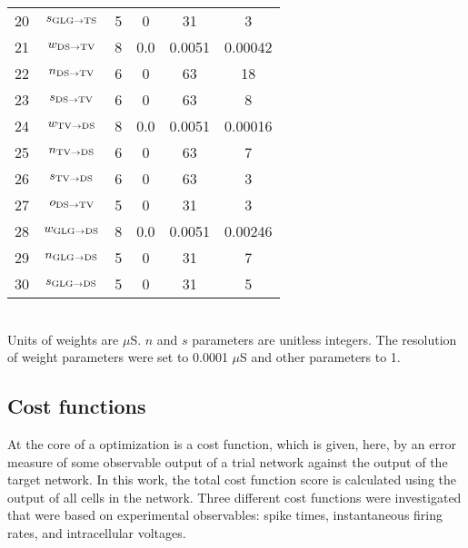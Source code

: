 \begin{table}[tp]
\begin{tabularx}{0.7\textwidth}{lccccc}
20 & $s_{{\rm GLG}\to {\rm TS}} $  &  5  &  0  &    31     & 3 \\   %
21 &  $w_{{\rm DS}\to {\rm TV}} $  &  8  & 0.0 &  0.0051   & 0.00042 \\ %
22 &  $n_{{\rm DS}\to {\rm TV}} $  &  6  &  0  &    63     & 18 \\ %
23 &  $s_{{\rm DS}\to {\rm TV}} $  &  6  &  0  &    63     & 8 \\   %
24 &  $w_{{\rm TV}\to {\rm DS}} $  &  8  & 0.0 &  0.0051   & 0.00016 \\ %
25 &  $n_{{\rm TV}\to {\rm DS}} $  &  6  &  0  &    63     & 7   \\ %
26 &  $s_{{\rm TV}\to {\rm DS}} $  &  6  &  0  &    63     & 3 \\   %
27 &  $o_{{\rm DS}\to {\rm TV}} $  &  5  &  0  &    31     & 3 \\ %
28 & $w_{{\rm GLG}\to {\rm DS}} $  &  8  & 0.0 &  0.0051   & 0.00246 \\   %
29 & $n_{{\rm GLG}\to {\rm DS}} $  &  5  &  0  &    31     & 7 \\ %
30 & $s_{{\rm GLG}\to {\rm DS}} $ &  5  &  0  &    31     & 5 \\[0.5ex] \bottomrule
\end{tabularx}\\
\vspace{0.5ex} 
\footnotesize{Units of weights are $\mu$S. $n$ and $s$
  parameters are unitless integers. The resolution of weight
  parameters were set to 0.0001 $\mu$S and other parameters to 1.}
\end{table}




\subsection{Cost functions}\label{sec:GA:cost-functions}

At the core of a {\GA} optimization is a cost function, which is given,
here, by an error measure of some observable output of a trial network
against the output of the target network. In this work, the total cost
function score is calculated using the output of all cells in the
network.  Three different cost functions were investigated that were
based on experimental observables: spike times, instantaneous firing
rates, and intracellular voltages.


